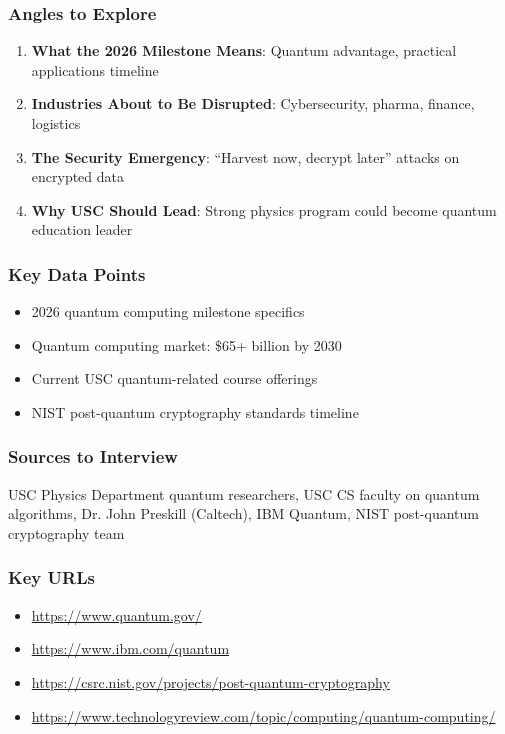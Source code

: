 \documentclass[11pt,letterpaper]{article}
\begin{document}
\subsubsection*{Angles to Explore}
\begin{enumerate}[noitemsep]
    \item \textbf{What the 2026 Milestone Means}: Quantum advantage, practical applications timeline
    \item \textbf{Industries About to Be Disrupted}: Cybersecurity, pharma, finance, logistics
    \item \textbf{The Security Emergency}: ``Harvest now, decrypt later'' attacks on encrypted data
    \item \textbf{Why USC Should Lead}: Strong physics program could become quantum education leader
\end{enumerate}

\subsubsection*{Key Data Points}
\begin{itemize}[noitemsep]
    \item 2026 quantum computing milestone specifics
    \item Quantum computing market: \$65+ billion by 2030
    \item Current USC quantum-related course offerings
    \item NIST post-quantum cryptography standards timeline
\end{itemize}

\subsubsection*{Sources to Interview}
USC Physics Department quantum researchers, USC CS faculty on quantum algorithms, Dr. John Preskill (Caltech), IBM Quantum, NIST post-quantum cryptography team

\subsubsection*{Key URLs}
\begin{itemize}[noitemsep]
    \item \url{https://www.quantum.gov/}
    \item \url{https://www.ibm.com/quantum}
    \item \url{https://csrc.nist.gov/projects/post-quantum-cryptography}
    \item \url{https://www.technologyreview.com/topic/computing/quantum-computing/}
\end{itemize}
\end{document}
